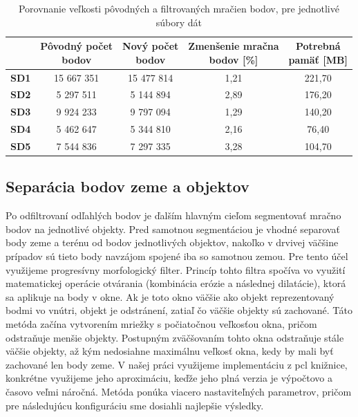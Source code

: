\begin{table}
    \begin{center}
        \begin{tabular}{|c || c | c | c| c|} 
         \hline
         &  \thead{Pôvodný počet \\ bodov} &
            \thead{Nový počet \\ bodov} &
            \thead{Zmenšenie mračna \\ bodov [\%]} &
            \thead{Potrebná \\ pamäť [MB]} \\ [0.5ex] 
         \hline\hline
         \textbf{SD1} & 15 667 351 & 15 477 814 & 1,21 & 221,70 \\ 
         \hline
         \textbf{SD2} & 5 297 511 & 5 144 894 & 2,89 & 176,20 \\
         \hline
         \textbf{SD3} &  9 924 233 & 9 797 094 & 1,29 & 140,20 \\
         \hline
         \textbf{SD4} & 5 462 647 & 5 344 810 & 2,16 & 76,40 \\
         \hline
         \textbf{SD5} & 7 544 836 & 7 297 335 & 3,28 & 104,70 \\
         \hline
        \end{tabular}
    \caption{Porovnanie veľkosti pôvodných a filtrovaných mračien bodov, pre jednotlivé súbory dát}
    \end{center}
\end{table}

\subsection{Separácia bodov zeme a objektov}
\noindent Po odfiltrovaní odľahlých bodov je ďalším hlavným cieľom segmentovať mračno bodov na jednotlivé objekty. Pred samotnou segmentáciou je vhodné separovať body zeme a terénu od bodov jednotlivých objektov, nakoľko v drvivej väčšine prípadov sú tieto body navzájom spojené iba so samotnou zemou.
\newline\indent Pre tento účel využijeme progresívny morfologický filter. Princíp tohto filtra spočíva vo využití matematickej operácie otvárania (kombinácia erózie a následnej dilatácie), ktorá sa aplikuje na body v okne. Ak je toto okno väčšie ako objekt reprezentovaný bodmi vo vnútri, objekt je odstránení, zatiaľ čo väčšie objekty sú zachované. Táto metóda začína vytvorením mriežky s počiatočnou veľkosťou okna, pričom odstraňuje menšie objekty. Postupným zväčšovaním tohto okna odstraňuje stále väčšie objekty, až kým nedosiahne maximálnu veľkosť okna, kedy by mali byť zachované len body zeme. \cite{morph_filter}
\newline\indent V našej práci využijeme implementáciu z \acrshort{pcl} knižnice, konkrétne využijeme jeho aproximáciu, keďže jeho plná verzia je výpočtovo a časovo veľmi náročná. Metóda ponúka viacero nastaviteľných parametrov, pričom pre následujúcu konfiguráciu sme dosiahli najlepšie výsledky. 

